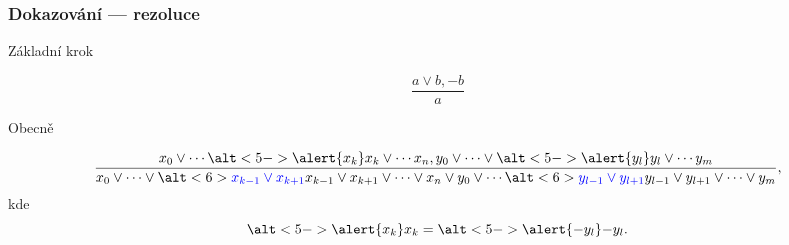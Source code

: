 \documentclass[red,professionalfont]{beamer}
\theoremstyle{definition}
\newcommand{\0}{\mbox{${\bf 0}$}}
\begin{document}
\begin{frame}\frametitle{Dokazování --- rezoluce}
\begin{block}{}
\begin{center}
Základní krok\pause
\end{center}
\end{block}
\begin{displaymath}
 \frac{a\vee b, -b}{a}
\end{displaymath}\pause
\begin{center}
Obecně\pause
\end{center}
\vskip1cm
\begin{displaymath}
 \frac{x_0\vee\cdots \alt<5->{\alert{x_k}}{x_k}\vee\cdots x_n, y_0\vee\cdots \vee \alt<5->{\alert{y_l}}{y_l}\vee\cdots y_m}
{x_0\vee\cdots\vee \alt<6>{\textcolor{blue}{x_{k-1}\vee x_{k+1}}}{x_{k-1}\vee x_{k+1}}\vee\cdots\vee x_n\vee 
 y_0\vee\cdots \alt<6>{\textcolor{blue}{y_{l-1}\vee y_{l+1}}}{y_{l-1}\vee y_{l+1}}\vee\cdots\vee y_m},
\end{displaymath}
kde 
\begin{displaymath}
 \alt<5->{\alert{x_k}}{x_k} = \alt<5->{\alert{-y_l}}{-y_l}.
\end{displaymath}
\end{frame}
\end{document}
